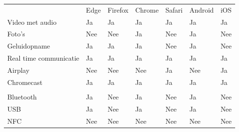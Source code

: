 		\begin{table}[]
			\centering
			\begin{tabular}{p{6cm}p{13mm}p{15mm}p{13mm}p{13mm}p{13mm}p{13mm}}
				& Edge & Firefox & Chrome & Safari& Android & iOS \\ 
				
				Video met audio & \cellcolor{green!40} Ja  & \cellcolor{green!40} Ja & \cellcolor{green!40} Ja  & \cellcolor{green!40} Ja & \cellcolor{green!40} Ja & \cellcolor{green!40} Ja \\
				
				Foto's & \cellcolor{red!50} Nee  & \cellcolor{red!50} Nee & \cellcolor{green!40} Ja  & \cellcolor{red!50} Nee  & \cellcolor{green!40} Ja & \cellcolor{red!50} Nee \\
				
				Geluidopname & \cellcolor{green!40} Ja  & \cellcolor{green!40} Ja & \cellcolor{green!40} Ja & \cellcolor{red!50} Nee  & \cellcolor{green!40} Ja & \cellcolor{red!50} Nee \\
				
				Real time communicatie& \cellcolor{green!40} Ja  & \cellcolor{green!40} Ja & \cellcolor{green!40} Ja  & \cellcolor{green!40} Ja & \cellcolor{green!40} Ja & \cellcolor{green!40} Ja \\
				
				Airplay & \cellcolor{red!50} Nee & \cellcolor{red!50} Nee & \cellcolor{red!50} Nee  & \cellcolor{green!40} Ja & \cellcolor{red!50} Nee & \cellcolor{green!40} Ja \\
				
				Chromecast & \cellcolor{green!40} Ja  & \cellcolor{green!40} Ja & \cellcolor{green!40} Ja  & \cellcolor{green!40} Ja & \cellcolor{green!40} Ja & \cellcolor{green!40} Ja \\
				
				 &  & &  &  &  &  \\
				 
				 Bluetooth & \cellcolor{green!40} Ja  &  \cellcolor{red!50} Nee & \cellcolor{green!40} Ja  & \cellcolor{red!50} Nee & \cellcolor{green!40} Ja &  \cellcolor{red!50} Nee \\
				 
				 USB & \cellcolor{green!40} Ja  &  \cellcolor{red!50} Nee & \cellcolor{green!40} Ja  & \cellcolor{red!50} Nee & \cellcolor{green!40} Ja &  \cellcolor{red!50} Nee \\
				 
				 NFC &  \cellcolor{red!50} Nee  &  \cellcolor{red!50} Nee &  \cellcolor{red!50} Nee  & \cellcolor{red!50} Nee &  \cellcolor{red!50} Nee &  \cellcolor{red!50} Nee \\
				 

\end{tabular}
\end{table}
